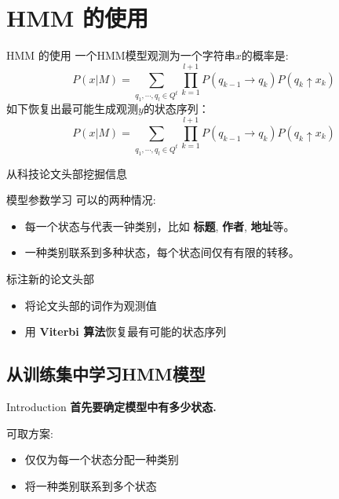 \documentclass{beamer}
\begin{document}
\section{HMM 的使用}
\begin{frame}{HMM 的使用}
    一个HMM模型观测为一个字符串$x$的概率是:
    \begin{equation}
    P(x|M) = \sum_{q_1,\cdots,q_l \in Q^t} {
        \prod_{k=1}^{l+1}{
            P(q_{k-1} \rightarrow q_k) P(q_k \uparrow x_k)
        }
    }
    \end{equation}
    如下恢复出最可能生成观测$y$的状态序列：
    \begin{equation}
    P(x|M) = \sum_{q_1,\cdots,q_l \in Q^t} {
        \prod_{k=1}^{l+1}{
            P(q_{k-1} \rightarrow q_k) P(q_k \uparrow x_k)
        }
    }
    \end{equation}
\end{frame}

\begin{frame}{ 从科技论文头部挖掘信息}
    \begin{block}{模型参数学习}
        可以的两种情况:
        \begin{itemize}
            \item 每一个状态与代表一钟类别，比如 \textbf{标题}, \textbf{作者}, \textbf{地址}等。
            \item 一种类别联系到多种状态，每个状态间仅有有限的转移。
        \end{itemize}
    \end{block}
    
    \begin{block}{ 标注新的论文头部}
        \begin{itemize}
            \item 将论文头部的词作为观测值
            \item 用 \textbf{Viterbi 算法}恢复最有可能的状态序列
        \end{itemize}
    \end{block}
\end{frame}

\subsection{从训练集中学习HMM模型}
\begin{frame}{Introduction}
    \textbf{首先要确定模型中有多少状态.}
    \begin{block}{可取方案:}
        \begin{itemize}
            \item 仅仅为每一个状态分配一种类别
            \item 将一种类别联系到多个状态
        \end{itemize}
    \end{block}
\end{frame}
\end{document}
